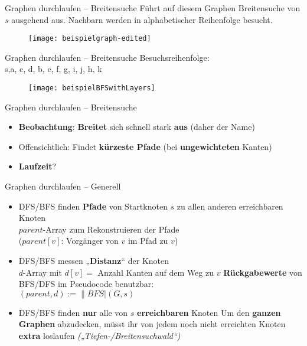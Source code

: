 \begin{frame}{Graphen durchlaufen – Breitensuche}
	Führt auf diesem Graphen Breitensuche von $s$ ausgehend aus. Nachbarn werden in alphabetischer Reihenfolge besucht.
	\vspace{-.3\baselineskip}
	\begin{figure}[htp]
		\centering
		\texttt{[image: beispielgraph-edited]}
	\end{figure}
\end{frame}

\begin{frame}{Graphen durchlaufen – Breitensuche}
	\solutionheading
	Besuchsreihenfolge: \\ s,\quad a, c, d, \quad b, e, f, g, i, j, \quad h, k
	\vspace{-.3\baselineskip}
	\begin{figure}[htp]
		\centering
		\texttt{[image: beispielBFSwithLayers]}
	\end{figure}
\end{frame}

\begin{frame}{Graphen durchlaufen – Breitensuche}
	\begin{itemize}
		\item<+-> \textbf{Beobachtung}: \textbf{Breitet} sich schnell stark \textbf{aus} (daher der Name)
		\item<+-> Offensichtlich: Findet \textbf{kürzeste Pfade} (bei \textbf{ungewichteten} Kanten)
		\item<+-> \textbf{Laufzeit}? \visible<+->{$\Theta(n+m)$} \\ 
	\end{itemize}
\end{frame}

\begin{frame}{Graphen durchlaufen – Generell}
	\begin{itemize}
		\item DFS/BFS finden \textbf{Pfade} von Startknoten $s$ zu allen anderen erreichbaren Knoten \\
		\impl $parent$-Array zum Rekonstruieren der Pfade \\
		{\small ($parent[v]$: Vorgänger von $v$ im Pfad zu $v$)}
		\item DFS/BFS messen „\textbf{Distanz}“ der Knoten \\
		\impl $d$-Array mit $d[v] = $ Anzahl Kanten auf dem Weg zu $v$ 
		\implitem \textbf{Rückgabewerte} von BFS/DFS im Pseudocode benutzbar: \\
		$(parent, d) := \|BFS|(G, s)$  \\
		\bigskip
		\pause
		\item DFS/BFS finden \textbf{nur} alle von $s$ \textbf{erreichbaren} Knoten
		\implitem Um den \textbf{ganzen Graphen} abzudecken, müsst ihr von jedem noch nicht erreichten Knoten \textbf{extra} loslaufen \: \emph{(„Tiefen-/Breitensuchwald“)}
	\end{itemize}
\end{frame}


